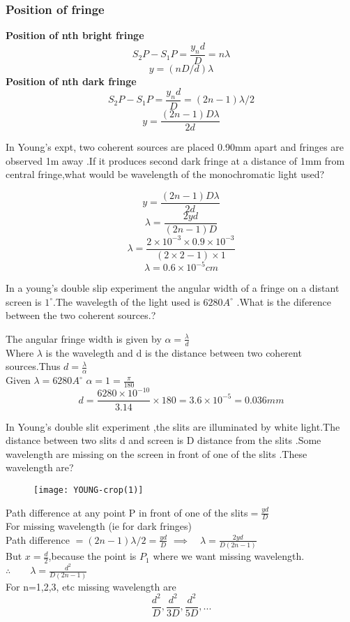 \subsubsection{Position of fringe}
\textbf{Position of nth bright fringe}\\
$$S_{2} P-S_{1} P= \frac{y_{n} d}{D}=n\lambda$$
$$y=\left( nD/d\right) \lambda$$
\textbf{Position of nth dark fringe}\\
$$S_{2} P-S_{1} P= \frac{y_{n} d}{D}=(2n-1)\lambda/2$$
$$y=\frac{(2n-1)D \lambda}{2d}$$
\begin{exercise}
	In Young's  expt, two coherent sources are placed 0.90mm apart and fringes are observed 1m away .If it produces second dark fringe at a distance of 1mm from central fringe,what would be wavelength of the monochromatic light used?
\end{exercise}
\begin{answer}
	$$y=\frac{(2n-1)D \lambda}{2d}$$
	$$\lambda=\frac{2yd}{(2n-1)D}$$
	$$\lambda=\frac{2\times 10^{-3}\times 0.9\times 10^{-3}}{(2\times 2-1)\times 1}$$
	$$\lambda=0.6\times 10^{-5}cm$$
\end{answer}
\begin{exercise}
	In a young's double slip experiment the angular width of a fringe on a distant screen is $1^{\circ}$.The wavelegth of the light used is $6280A^{\circ}$ .What is the diference between the two coherent sources.?
\end{exercise}
\begin{answer}
	The angular fringe width is given by $\alpha=\frac{\lambda}{d}$\\
	Where $\lambda$ is the wavelegth and d is the distance between two coherent sources.Thus $d=\frac{\lambda}{\alpha}$\\
	Given $\lambda=6280A^{\circ}$ $\alpha=1=\frac{\pi}{180}$
$$d=\frac{6280\times 10^{-10}}{3.14}\times 180=3.6\times10^{-5}=0.036mm$$	
\end{answer}
\begin{exercise}
	In Young's double slit experiment ,the slits are illuminated by white light.The distance between two slits d and screen is D distance from the slits .Some wavelength are missing on the screen in front of one of the slits .These wavelength are?
\end{exercise}
\begin{answer}
	\begin{figure}[H]
		\centering
		\texttt{[image: YOUNG-crop(1)]}
		\caption{}
		\label{}
	\end{figure}
Path difference at any point P in front of one of the slits$=\frac{yd}{D}$\\
For missing wavelength (ie for dark fringes)\\
Path difference $=(2n-1)\lambda/2=\frac{yd}{D}$
$\implies \quad \lambda=\frac{2yd}{D(2n-1)}$\\
But $x=\frac{d}{2}$,because the point is $P_1$ where we want missing wavelength.\\
$\therefore \quad \quad \lambda=\frac{d^2}{D(2n-1)}	$\\
For n=1,2,3, etc missing wavelength are \\
$$\frac{d^2}{D},\frac{d^2}{3D},\frac{d^2}{5D},...$$
\end{answer}
